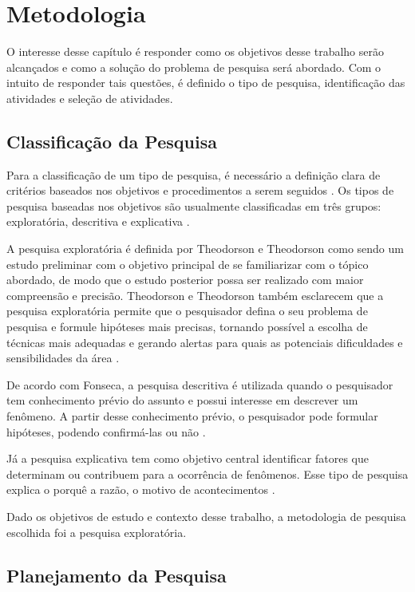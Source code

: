 \chapter[Metodologia]{Metodologia}

O interesse desse capítulo é responder como os objetivos desse trabalho serão alcançados e como a solução do problema de pesquisa será abordado. Com o intuito de responder tais questões, é definido o tipo de pesquisa, identificação das atividades e seleção de atividades.

\section{Classificação da Pesquisa}

Para a classificação de um tipo de pesquisa, é necessário a definição clara de critérios baseados nos objetivos e procedimentos a serem seguidos \cite{gil2002}. Os tipos de pesquisa baseadas nos objetivos são usualmente classificadas em três grupos: exploratória, descritiva e explicativa \cite{gil2002}.

A pesquisa exploratória é definida por Theodorson e Theodorson como sendo um estudo preliminar com o objetivo principal de se familiarizar com o tópico abordado, de modo que o estudo posterior possa ser realizado com maior compreensão e precisão. Theodorson e Theodorson também esclarecem que a pesquisa exploratória permite que o pesquisador defina o seu problema de pesquisa e formule hipóteses mais precisas, tornando possível a escolha de técnicas mais adequadas e gerando alertas para quais as potenciais dificuldades e sensibilidades da área \cite{theodorson1970}.

De acordo com Fonseca, a pesquisa descritiva é utilizada quando o pesquisador tem conhecimento prévio do assunto e possui interesse em descrever um fenômeno. A partir desse conhecimento prévio, o pesquisador pode formular hipóteses, podendo confirmá-las ou não \cite{fonseca2002}.

Já a pesquisa explicativa tem como objetivo central identificar fatores que determinam ou contribuem para a ocorrência de fenômenos. Esse tipo de pesquisa explica o porquê a razão, o motivo de acontecimentos \cite{gil2002}.

Dado os objetivos de estudo e contexto desse trabalho, a metodologia de pesquisa escolhida foi a pesquisa exploratória.

\section{Planejamento da Pesquisa}

